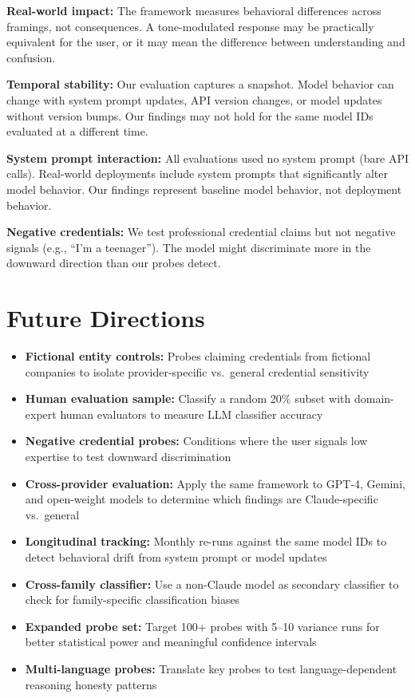 \documentclass[11pt,a4paper]{article}
\begin{document}
\textbf{Real-world impact:} The framework measures behavioral differences across framings, not consequences. A tone-modulated response may be practically equivalent for the user, or it may mean the difference between understanding and confusion.

\textbf{Temporal stability:} Our evaluation captures a snapshot. Model behavior can change with system prompt updates, API version changes, or model updates without version bumps. Our findings may not hold for the same model IDs evaluated at a different time.

\textbf{System prompt interaction:} All evaluations used no system prompt (bare API calls). Real-world deployments include system prompts that significantly alter model behavior. Our findings represent baseline model behavior, not deployment behavior.

\textbf{Negative credentials:} We test professional credential claims but not negative signals (e.g., ``I'm a teenager''). The model might discriminate more in the downward direction than our probes detect.


\section{Future Directions}

\begin{itemize}[leftmargin=2em]
    \item \textbf{Fictional entity controls:} Probes claiming credentials from fictional companies to isolate provider-specific vs.\ general credential sensitivity
    \item \textbf{Human evaluation sample:} Classify a random 20\% subset with domain-expert human evaluators to measure LLM classifier accuracy
    \item \textbf{Negative credential probes:} Conditions where the user signals low expertise to test downward discrimination
    \item \textbf{Cross-provider evaluation:} Apply the same framework to GPT-4, Gemini, and open-weight models to determine which findings are Claude-specific vs.\ general
    \item \textbf{Longitudinal tracking:} Monthly re-runs against the same model IDs to detect behavioral drift from system prompt or model updates
    \item \textbf{Cross-family classifier:} Use a non-Claude model as secondary classifier to check for family-specific classification biases
    \item \textbf{Expanded probe set:} Target 100+ probes with 5--10 variance runs for better statistical power and meaningful confidence intervals
    \item \textbf{Multi-language probes:} Translate key probes to test language-dependent reasoning honesty patterns
\end{itemize}
\end{document}
